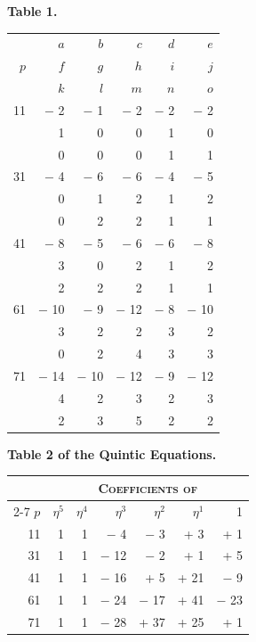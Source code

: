 \documentclass[11pt,a4paper]{book}
\begin{document}
\newpage
\begin{center}
\textbf{Table 1.}
\end{center}

\begin{center}
\begin{tabular}{r | r r r r r}
\multirow{3}{*}{$p$} & $a$ & $b$ & $c$ & $d$ & $e$ \\
 & $f$ & $g$ & $h$ & $i$ & $j$ \\
 & $k$ & $l$ & $m$ & $n$ & $o$ \\ \hline
11 & $-$ 2 & $-$ 1 & $-$ 2 & $-$ 2 & $-$ 2 \\
 & 1 & 0 & 0 & 1 & 0 \\
 & 0 & 0 & 0 & 1 & 1 \\[2pt]
31 & $-$ 4 & $-$ 6 & $-$ 6 & $-$ 4 & $-$ 5 \\
 & 0 & 1 & 2 & 1 & 2 \\
 & 0 & 2 & 2 & 1 & 1 \\[2pt]
41 & $-$ 8 & $-$ 5 & $-$ 6 & $-$ 6 & $-$ 8 \\
 & 3 & 0 & 2 & 1 & 2 \\
 & 2 & 2 & 2 & 1 & 1 \\[2pt]
61 & $-$ 10 & $-$ 9 & $-$ 12 & $-$ 8 & $-$ 10 \\
 & 3 & 2 & 2 & 3 & 2 \\
 & 0 & 2 & 4 & 3 & 3 \\[2pt]
71 & $-$ 14 & $-$ 10 & $-$ 12 & $-$ 9 & $-$ 12 \\
 & 4 & 2 & 3 & 2 & 3 \\
 & 2 & 3 & 5 & 2 & 2 \\
\end{tabular}
\end{center}

\vspace{\baselineskip}

\begin{center}
\textbf{Table 2 of the Quintic Equations.}
\end{center}

\begin{center}
\begin{tabular}{r | r r r r r r}
 & \multicolumn{6}{c}{\textsc{Coefficients of}} \\ \cline{2-7}
$p$ & $\eta^5$ & $\eta^4$ & $\eta^3$ & $\eta^2$ & $\eta^1$ & 1 \\ \hline
11 & 1 & 1 & $-$ 4 & $-$ 3 & + 3 & + 1 \\
31 & 1 & 1 & $-$ 12 & $-$ 2 & + 1 & + 5 \\
41 & 1 & 1 & $-$ 16 & + 5 & + 21 & $-$ 9 \\
61 & 1 & 1 & $-$ 24 & $-$ 17 & + 41 & $-$ 23 \\
71 & 1 & 1 & $-$ 28 & + 37 & + 25 & + 1
\end{tabular}
\end{center}
\end{document}
